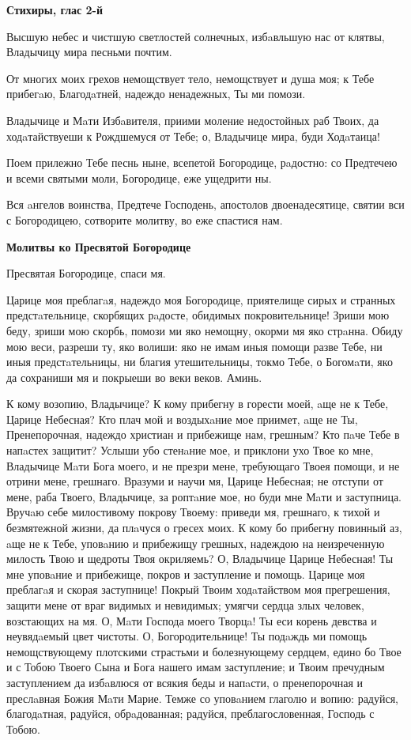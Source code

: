 \bfseries Стихиры, глас 2-й\normalfont{}


Высшую небес и чистшую светлостей солнечных, избaвльшую нас от клятвы, Владычицу мира песньми почтим.


От многих моих грехов немощствует тело, немощствует и душа моя; к Тебе прибегaю, Благодaтней, надеждо ненадежных, Ты ми помози.


Владычице и Мaти Избaвителя, приими моление недостойных раб Твоих, да ходaтайствуеши к Рождшемуся от Тебе; о, Владычице мира, буди Ходaтаица!


Поем прилежно Тебе песнь ныне, всепетой Богородице, рaдостно: со Предтечею и всеми святыми моли, Богородице, еже ущедрити ны.


Вся aнгелов воинства, Предтече Господень, апостолов двоенадесятице, святии вси с Богородицею, сотворите молитву, во еже спастися нам.




\bfseries Молитвы ко Пресвятой Богородице\normalfont{}


Пресвятая Богородице, спаси мя.


Царице моя преблагaя, надеждо моя Богородице, приятелище сирых и странных предстaтельнице, скорбящих рaдосте, обидимых покровительнице! Зриши мою беду, зриши мою скорбь, помози ми яко немощну, окорми мя яко стрaнна. Обиду мою веси, разреши ту, яко волиши: яко не имам иныя помощи разве Тебе, ни иныя предстaтельницы, ни благия утешительницы, токмо Тебе, о Богомaти, яко да сохраниши мя и покрыеши во веки веков. Аминь.


К кому возопию, Владычице? К кому прибегну в горести моей, aще не к Тебе, Царице Небесная? Кто плач мой и воздыхaние мое приимет, aще не Ты, Пренепорочная, надеждо христиан и прибежище нам, грешным? Кто пaче Тебе в напaстех защитит? Услыши убо стенaние мое, и приклони ухо Твое ко мне, Владычице Мaти Бога моего, и не презри мене, требующаго Твоея помощи, и не отрини мене, грешнаго. Вразуми и научи мя, Царице Небесная; не отступи от мене, раба Твоего, Владычице, за роптaние мое, но буди мне Мaти и заступница. Вручaю себе милостивому покрову Твоему: приведи мя, грешнаго, к тихой и безмятежной жизни, да плaчуся о гресех моих. К кому бо прибегну повинный аз, aще не к Тебе, уповaнию и прибежищу грешных, надеждою на неизреченную милость Твою и щедроты Твоя окриляемь? О, Владычице Царице Небесная! Ты мне уповaние и прибежище, покров и заступление и помощь. Царице моя преблагaя и скорая заступнице! Покрый Твоим ходaтайством моя прегрешения, защити мене от враг видимых и невидимых; умягчи сердца злых человек, возстающих на мя. О, Мaти Господа моего Творцa! Ты еси корень девства и неувядaемый цвет чистоты. О, Богородительнице! Ты подaждь ми помощь немощствующему плотскими страстьми и болезнующему сердцем, едино бо Твое и с Тобою Твоего Сына и Бога нашего имам заступление; и Твоим пречудным заступлением да избaвлюся от всякия беды и напaсти, о пренепорочная и преслaвная Божия Мaти Марие. Темже со уповaнием глаголю и вопию: радуйся, благодaтная, радуйся, обрaдованная; радуйся, преблагословенная, Господь с Тобою.


